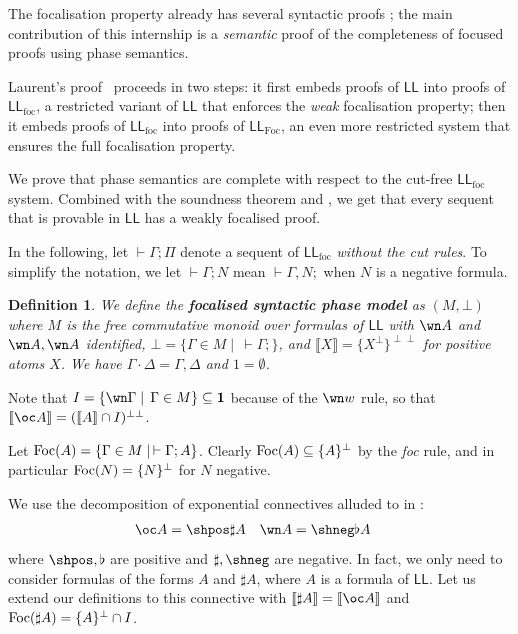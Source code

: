 \documentclass[11pt]{article}
\newtheorem{definition}{Definition}[section]
\newcommand\LL{\textsf{LL}}
\newcommand\0{\textbf{0}}
\newcommand\1{\textbf{1}}
\newcommand\LLfoc{{\LL_\text{foc}}}
\newcommand\LLFoc{{\LL_\text{Foc}}}
\newcommand\sem[1]{{\llbracket #1 \rrbracket}}
\newcommand\biperp{{\perp\perp}}
\newcommand\Foc{\textup{Foc}}
\begin{document}

The focalisation property already has several syntactic proofs \cite{andreoli} \cite{saurin} \cite{laurent}; the main
contribution of this internship is a \emph{semantic} proof of the completeness of focused proofs
using phase semantics.

Laurent's proof~\cite{laurent} proceeds in two steps: it first embeds proofs of $\LL$ into proofs of $\LLfoc$, a
restricted variant of $\LL$ that enforces the \emph{weak} focalisation property; then it embeds proofs of $\LLfoc$ into
proofs of $\LLFoc$, an even more restricted system that ensures the full focalisation property.

We prove that phase semantics are complete with respect to the cut-free $\LLfoc$ system. Combined with the soundness theorem
and \cite[proposition 1]{laurent}, we get that every sequent that is provable in $\LL$ has a weakly focalised proof.

In the following, let $\vdash \Gamma; \Pi$ denote a sequent of $\LLfoc$ \emph{without the cut rules}.
To simplify the notation, we let $\vdash \Gamma; N$ mean $\vdash \Gamma, N;$ when $N$ is a negative formula.

\begin{definition}
We define the \textbf{focalised syntactic phase model} as $(M, \bot)$ where $M$ is the
free commutative monoid over formulas of $\LL$ with $\wn A$ and $\wn A, \wn A$ identified,
$\bot = \{\Gamma \in M \mid\,\vdash \Gamma;\}$, and
$\sem{X} = \{X^\perp\}^\biperp$ for positive atoms $X$. We have $\Gamma \cdot \Delta = \Gamma, \Delta$ and $1 = \emptyset$.
\end{definition}

Note that $I = \{\wn \Gamma\mid\,\Gamma\in M\} \subseteq \1$ because of the $\wn w$ rule,
so that $\sem{\oc A} = (\sem{A} \cap I)^\biperp$.

Let $\Foc(A) = {\{\Gamma \in M \mid\, \vdash \Gamma; A\}}$.
Clearly $\Foc(A) \subseteq \{A\}^\perp$ by the \textit{foc} rule, and in particular
$\Foc(N) = \{N\}^\perp$ for $N$ negative.

We use the decomposition of exponential connectives alluded to in \cite[section 4.1]{laurent}: \begin{align*}
    \oc A &= \shpos\sharp A & \wn A &= \shneg\flat A
\end{align*}
where $\shpos, \flat$ are positive and $\sharp, \shneg$ are negative.
In fact, we only need to consider formulas of the forms $A$ and $\sharp A$, where $A$ is a formula of $\LL$.
Let us extend our definitions to this connective
with $\sem{\sharp A} = \sem{\oc A}$ and $\Foc(\sharp A) = \{A\}^\perp \cap I$.
\end{document}
